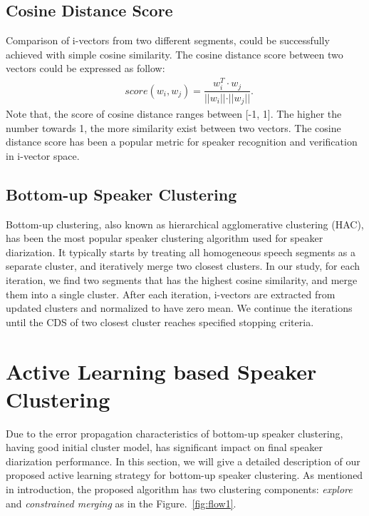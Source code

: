 \documentclass[journal]{IEEEtran}
\begin{document}
\subsection{Cosine Distance Score}
Comparison of  i-vectors from two different segments, could be successfully achieved with simple cosine similarity. The cosine distance score between two vectors could be expressed as follow:
\begin{equation}
\begin{aligned}
& score (w_i, w_j) = \dfrac{w^T_i \cdot w_j}{\rvert\rvert{w_i}\rvert\rvert \cdot \rvert\rvert{w_j}\rvert\rvert}.
\label{ws2}
\end{aligned}
\end{equation}
Note that, the score of cosine distance ranges between [-1, 1]. The higher the number towards 1, the more similarity exist between two vectors. The cosine distance score has been a popular metric for speaker recognition and verification in i-vector space.
 
\subsection{Bottom-up Speaker Clustering}
Bottom-up clustering, also known as hierarchical agglomerative clustering (HAC), has been the most popular speaker clustering algorithm used for speaker diarization. It typically starts by treating all homogeneous speech segments as a separate cluster, and iteratively merge two closest clusters. In our study, for each iteration, we find two segments that has the highest cosine similarity, and merge them into a single cluster. After each iteration, i-vectors are extracted from updated clusters and normalized to have zero mean. We continue the iterations until the CDS of two closest cluster reaches specified stopping criteria. 

\section{Active Learning based Speaker Clustering}
Due to the error propagation characteristics of bottom-up speaker clustering, having good initial cluster model, has significant impact on final speaker diarization performance. In this section, we will give a detailed description of our proposed active learning strategy for bottom-up speaker clustering. As mentioned in introduction, the proposed algorithm has two clustering components: \textit{explore} and \textit{constrained merging} as in the Figure.~\ref{fig:flow1}.
\end{document}
